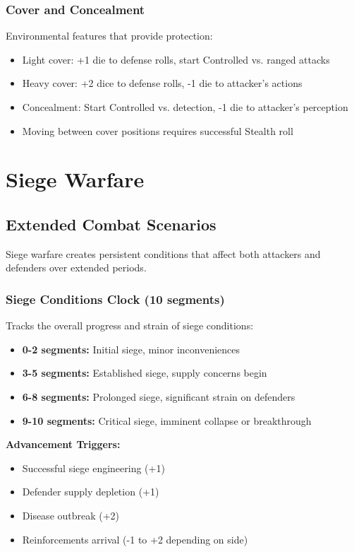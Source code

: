 \documentclass[11pt,letterpaper]{article}
\begin{document}
\subsubsection{Cover and Concealment}

Environmental features that provide protection:
\begin{itemize}[leftmargin=*]
    \item Light cover: +1 die to defense rolls, start Controlled vs. ranged attacks
    \item Heavy cover: +2 dice to defense rolls, -1 die to attacker's actions
    \item Concealment: Start Controlled vs. detection, -1 die to attacker's perception
    \item Moving between cover positions requires successful Stealth roll
\end{itemize}

\newpage

\section{Siege Warfare}

\subsection{Extended Combat Scenarios}

Siege warfare creates persistent conditions that affect both attackers and defenders over extended periods.

\subsubsection{Siege Conditions Clock (10 segments)}

Tracks the overall progress and strain of siege conditions:
\begin{itemize}[leftmargin=*]
    \item \textbf{0-2 segments:} Initial siege, minor inconveniences
    \item \textbf{3-5 segments:} Established siege, supply concerns begin
    \item \textbf{6-8 segments:} Prolonged siege, significant strain on defenders
    \item \textbf{9-10 segments:} Critical siege, imminent collapse or breakthrough
\end{itemize}

\textbf{Advancement Triggers:}
\begin{itemize}[leftmargin=*]
    \item Successful siege engineering (+1)
    \item Defender supply depletion (+1)
    \item Disease outbreak (+2)
    \item Reinforcements arrival (-1 to +2 depending on side)
\end{itemize}
\end{document}
